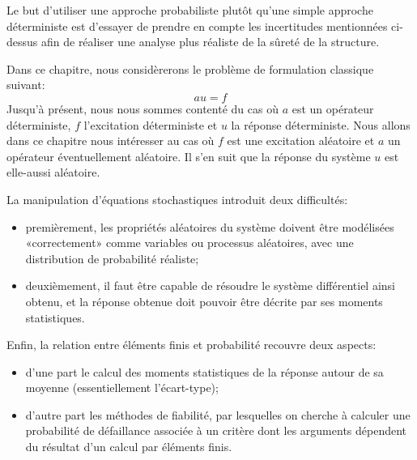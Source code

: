 Le but d'utiliser une approche probabiliste plutôt qu'une simple approche déterministe est d'essayer de prendre en compte les incertitudes mentionnées ci-dessus afin de réaliser une analyse plus réaliste de la sûreté de la structure.

\medskip
Dans ce chapitre, nous considèrerons le problème de formulation classique suivant:
\begin{equation}\label{Eq-Sto1}
au=f
\end{equation}
Jusqu'à présent, nous nous sommes contenté du cas où $a$ est un opérateur déterministe, $f$ l'excitation déterministe et $u$ la réponse déterministe.
Nous allons dans ce chapitre nous intéresser au cas où $f$ est une excitation aléatoire et $a$ un opérateur éventuellement aléatoire. Il s'en suit que la réponse du système $u$ est elle-aussi aléatoire.

\medskip
La manipulation d'équations stochastiques introduit deux difficultés:
\begin{itemize}
   \item premièrement, les propriétés aléatoires du système doivent être modélisées «correctement» comme variables ou processus aléatoires, avec une distribution de probabilité réaliste;
   \item deuxièmement, il faut être capable de résoudre le système différentiel ainsi obtenu, et la réponse obtenue doit pouvoir être décrite par ses moments statistiques.
\end{itemize}

\medskip
Enfin, la relation entre éléments finis et probabilité recouvre deux aspects:
\begin{itemize}
   \item d'une part le calcul des moments statistiques de la réponse autour de sa moyenne (essentiellement l'écart-type);
   \item d'autre part les méthodes de fiabilité, par lesquelles on cherche à calculer une probabilité de défaillance associée à un critère dont les arguments dépendent du résultat d'un calcul par éléments finis.
\end{itemize}

